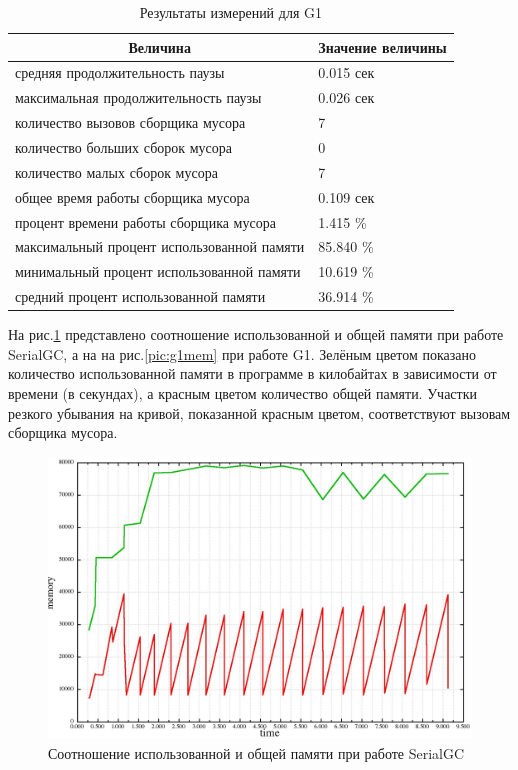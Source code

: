 \documentclass[12pt,a4paper]{article}
\begin{document}
\begin{table}[h!]
\caption {\label{table:g1}Результаты измерений для G1}
\begin{center}
\begin{tabular}{|l|l|}
\hline
\multicolumn{1}{|c|}{Величина} & Значение величины\\
\hline
средняя продолжительность паузы & 0.015 сек\\
\hline
максимальная продолжительность паузы & 0.026 сек\\
\hline
количество вызовов сборщика мусора & 7\\
\hline
количество больших сборок мусора & 0 \\
\hline
количество малых сборок мусора & 7 \\
\hline
общее время работы сборщика мусора & 0.109 сек\\
\hline
процент времени работы сборщика мусора & 1.415 \%\\
\hline
максимальный процент использованной памяти & 85.840 \%\\
\hline
минимальный процент использованной памяти & 10.619 \%\\
\hline
средний процент использованной памяти & 36.914 \%\\
\hline
\end{tabular}
\end{center}
\end{table}

\newpage
На рис.\ref{pic:serialmem} представлено соотношение использованной и общей памяти
при работе SerialGC, а на на рис.\ref{pic:g1mem} при работе G1. Зелёным цветом показано
количество использованной памяти в программе в килобайтах в зависимости от времени (в секундах),
а красным цветом количество общей памяти. Участки резкого убывания на кривой, показанной красным цветом,
соответствуют вызовам сборщика мусора.

\begin{figure}
\caption{\label{pic:serialmem}Соотношение использованной и общей памяти при работе SerialGC}
\includegraphics[width=1\linewidth]{serialmem.jpg}
\end{figure}
\end{document}
